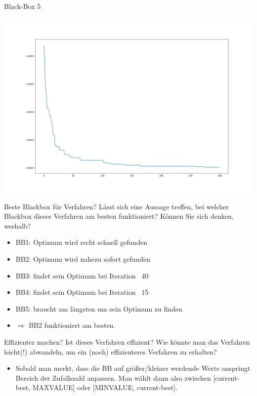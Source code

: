 \documentclass{ocbeameruni}
\begin{document}
\begin{frame}{Black-Box 5}
    \begin{center}
    \includegraphics[scale=0.25]{plots/bb5_2.png}
    \end{center}
\end{frame}

\begin{frame}{Beste Blackbox für Verfahren?}
Lässt sich eine Aussage treffen, bei welcher Blackbox dieses Verfahren am besten funktioniert?
Können Sie sich denken, weshalb?
    \begin{itemize}
    \item BB1: Optimum wird recht schnell gefunden
    \item BB2: Optimum wird nahezu sofort gefunden
    \item BB3: findet sein Optimum bei Iteration ~40
    \item BB4: findet sein Optimum bei Iteration ~15
    \item BB5: braucht am längsten um sein Optimum zu finden
    \item $\Rightarrow$ BB2 funktioniert am besten.
    \end{itemize}
\end{frame}


\begin{frame}{Effizienter machen?}
Ist dieses Verfahren effizient? Wie könnte man das Verfahren leicht(!) abwandeln, um ein (noch)
effizienteres Verfahren zu erhalten?
    \begin{itemize}
    \item Sobald man merkt, dass die BB auf größer/kleiner werdende Werte anspringt Bereich der Zufallszahl anpassen. Man wählt dann also zwischen [current-best, MAXVALUE] oder [MINVALUE, current-best]. 
    \end{itemize}
\end{frame}
\end{document}
